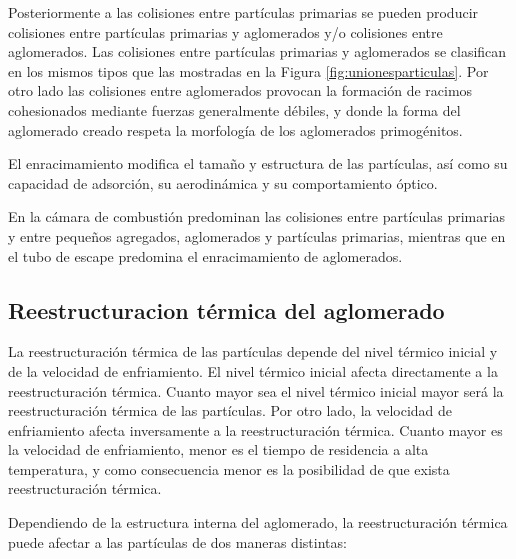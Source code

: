 \par Posteriormente a las colisiones entre partículas primarias se pueden producir colisiones entre partículas primarias y aglomerados y/o colisiones entre aglomerados. Las colisiones entre partículas primarias y aglomerados se clasifican en los mismos tipos que las mostradas en la Figura \ref{fig:unionesparticulas}. Por otro lado las colisiones entre aglomerados provocan la formación de racimos cohesionados mediante fuerzas generalmente débiles, y donde la forma del aglomerado creado respeta la morfología de los aglomerados primogénitos.

\par El enracimamiento modifica el tamaño y estructura de las partículas, así como su capacidad de adsorción, su aerodinámica y su comportamiento óptico.	
\par En la cámara de combustión predominan las colisiones entre partículas primarias y entre pequeños agregados, aglomerados y partículas primarias, mientras que en el tubo de escape predomina el enracimamiento de aglomerados.

\subsection{Reestructuracion térmica del aglomerado} \label{subsec:ReestructuracionTermica}

\par La reestructuración térmica de las partículas depende del nivel térmico inicial y de la velocidad de enfriamiento. El nivel térmico inicial afecta directamente a la reestructuración térmica. Cuanto mayor sea el nivel térmico inicial mayor será la reestructuración térmica de las partículas. Por otro lado, la velocidad de enfriamiento afecta inversamente a la reestructuración térmica. Cuanto mayor es la velocidad de enfriamiento, menor es el tiempo de residencia a alta temperatura, y como consecuencia menor es la posibilidad de que exista reestructuración térmica.

\par Dependiendo de la estructura interna del aglomerado, la reestructuración térmica puede afectar a las partículas de dos maneras distintas:

